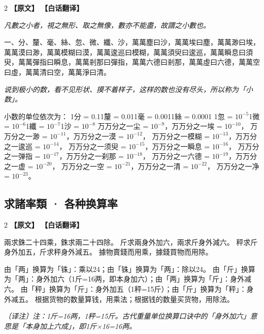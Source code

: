 \documentclass[11pt,a4paper]{article}
\newcommand{\noteMOD}[1]{\par\textcolor{notecolor}{\small\textit{〔译注〕#1}}\par\smallskip}
\begin{document}
\begin{paracol}{2}
\noindent\textbf{\textcolor{leftlabel}{【原文】}}
\switchcolumn
\noindent\textbf{\textcolor{rightlabel}{【白话翻译】}}
\switchcolumn*

\textit{凡數之小者，視之無形、取之無像，數亦不能盡，故謂之小數也。}

\medskip

一、分、釐、毫、絲、忽、微、纖、沙，萬萬塵曰沙，萬萬埃曰塵，萬萬渺曰埃，萬萬漠曰渺，萬萬模糊曰漠，萬萬逡巡曰模糊，萬萬須臾曰逡巡，萬萬瞬息曰須臾，萬萬彈指曰瞬息，萬萬剎那曰彈指，萬萬六德曰剎那，萬萬虛曰六德，萬萬空曰虛，萬萬清曰空，萬萬淨曰清。

\switchcolumn

\textit{说到极小的数，看不见形状、摸不着样子，这样的数也没有尽头，所以称为「小数」。}

\medskip

小数的单位依次为：\break
1分 = 0.1\quad 1釐 = 0.01\quad 1毫 = 0.001\quad 1絲 = 0.0001\quad
1忽 = $10^{-5}$\quad 1微 = $10^{-6}$\quad 1纖 = $10^{-7}$\quad 1沙 = $10^{-8}$\break
万万分之一尘 = $10^{-9}$，万万分之一埃 = $10^{-10}$，\break
万万分之一渺 = $10^{-11}$，万万分之一漠 = $10^{-12}$，\break
万万分之一模糊 = $10^{-13}$，万万分之一逡巡 = $10^{-14}$，\break
万万分之一须臾 = $10^{-15}$，万万分之一瞬息 = $10^{-16}$，\break
万万分之一弹指 = $10^{-17}$，万万分之一刹那 = $10^{-18}$，\break
万万分之一六德 = $10^{-19}$，万万分之一虚 = $10^{-20}$，\break
万万分之一空 = $10^{-21}$，万万分之一清 = $10^{-22}$，\break
万万分之一净 = $10^{-23}$。

\end{paracol}

\medskip

\subsection{求諸率類 · 各种换算率}

\begin{paracol}{2}
\noindent\textbf{\textcolor{leftlabel}{【原文】}}
\switchcolumn
\noindent\textbf{\textcolor{rightlabel}{【白话翻译】}}
\switchcolumn*

兩求銖二十四乘，銖求兩二十四除。\break
斤求兩身外加六，兩求斤身外減六。\break
秤求斤身外加五，斤求秤身外減五。\break
據物賣錢而用乘，據錢買物而用除。

\switchcolumn

由「两」换算为「铢」：乘以24；由「铢」换算为「两」：除以24。\break
由「斤」换算为「两」：身外加六（1斤=16两，即本身加六）；由「两」换算为「斤」：身外减六。\break
由「秤」换算为「斤」：身外加五（1秤=15斤）；由「斤」换算为「秤」：身外减五。\break
根据货物的数量算钱，用乘法；根据钱的数量买货物，用除法。

\noteMOD{注：1斤=16两，1秤=15斤。古代重量单位换算口诀中的「身外加六」意思是「本身加上六成」，即1斤×16=16两。}

\end{paracol}
\end{document}
